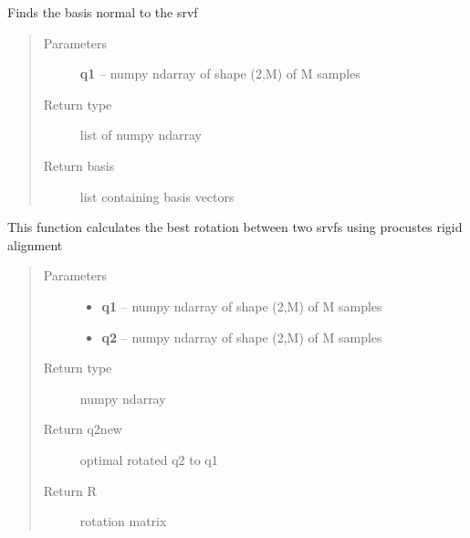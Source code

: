 \documentclass[letterpaper,10pt,english]{sphinxmanual}
\begin{document}
\begin{fulllineitems}
\label{curve_functions:curve_functions.find_basis_normal}
Finds the basis normal to the srvf
\begin{quote}\begin{description}
\item[{Parameters}] \leavevmode
\textbf{q1} -- numpy ndarray of shape (2,M) of M samples

\item[{Return type}] \leavevmode
list of numpy ndarray

\item[{Return basis}] \leavevmode
list containing basis vectors

\end{description}\end{quote}

\end{fulllineitems}


\begin{fulllineitems}
\label{curve_functions:curve_functions.find_best_rotation}
This function calculates the best rotation between two srvfs using
procustes rigid alignment
\begin{quote}\begin{description}
\item[{Parameters}] \leavevmode\begin{itemize}
\item {} 
\textbf{q1} -- numpy ndarray of shape (2,M) of M samples

\item {} 
\textbf{q2} -- numpy ndarray of shape (2,M) of M samples

\end{itemize}

\item[{Return type}] \leavevmode
numpy ndarray

\item[{Return q2new}] \leavevmode
optimal rotated q2 to q1

\item[{Return R}] \leavevmode
rotation matrix

\end{description}\end{quote}

\end{fulllineitems}
\end{document}

